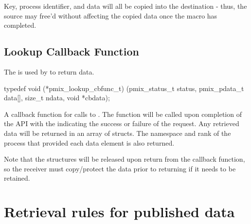 \adviceuserstart
Key, process identifier, and data will all be copied into the destination  - thus, the source  may free'd without affecting the copied data once the macro has completed.
\adviceuserend


\subsection{Lookup Callback Function}

\summary

The  is used by  to return data.

\cspecificstart
\begin{codepar}
typedef void (*pmix_lookup_cbfunc_t)
    (pmix_status_t status,
     pmix_pdata_t data[], size_t ndata,
     void *cbdata);
\end{codepar}
\cspecificend

\begin{arglist}
\end{arglist}


\descr

A callback function for calls to .
The function will be called upon completion of the  \ac{API} with the  indicating the success or failure of the request.
Any retrieved data will be returned in an array of  structs.
The namespace and rank of the process that provided each data element is also returned.

Note that the  structures will be released upon return from the callback function, so the receiver must copy/protect the data prior to returning if it needs to be retained.


\section{Retrieval rules for published data}
\label{chap:pub:retrules}

